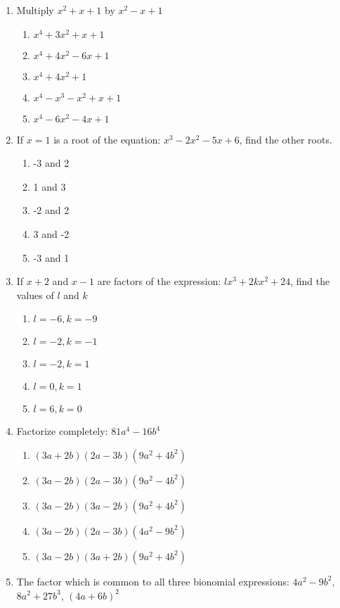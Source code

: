 \begin{multicols}{2}
\begin{enumerate}[label={\arabic*.}]
\begin{enumerate}[label={\Alph*.}]
      \end{enumerate}
    \item Multiply \({x}^{2}+x+1\) by \({x}^{2}-x+1\)
      \begin{enumerate}[label={\Alph*.}]
        \item \(x^4+3{x}^{2}+x+1\)
        \item \(x^4+4{x}^{2}-6x+1\)
        \item \(x^4+4{x}^{2}+1\)
        \item \(x^4-{x}^{3}-{x}^{2}+x+1\)
        \item \(x^4-6{x}^{2}-4x+1\)
      \end{enumerate}
    \item If \(x = 1\) is a root of the equation: \({x}^{3}-2{x}^{2}-5x+6\), find the other roots.
      \begin{enumerate}[label={\Alph*.}]
        \item -3 and 2
        \item 1 and 3
        \item -2 and 2
        \item 3 and -2
        \item -3 and 1
      \end{enumerate}
    \item If \(x+2\) and \(x-1\) are factors of the expression: \(l{x}^{3}+2k{x}^{2}+24\), find the values of \(l\) and \(k\)
      \begin{enumerate}[label={\Alph*.}]
        \item \(l=-6, k=-9\)
        \item \(l=-2, k=-1\)
        \item \(l=-2, k=1\)
        \item \(l=0, k=1\)
        \item \(l=6, k=0\)
      \end{enumerate}
    \item Factorize completely: \(81a^4-16b^4\)
      \begin{enumerate}[label={\Alph*.}]
        \item \((3a+2b)(2a-3b)(9a^2+4b^2)\)
        \item \((3a-2b)(2a-3b)(9a^2-4b^2)\)
        \item \((3a-2b)(3a-2b)(9a^2+4b^2)\)
        \item \((3a-2b)(2a-3b)(4a^2-9b^2)\)
        \item \((3a-2b)(3a+2b)(9a^2+4b^2)\)
      \end{enumerate}
    \item The factor which is common to all three bionomial expressions: \(4a^2-9b^2\), \(8a^2+27b^3\), \({(4a+6b)}^2\)

\end{enumerate}
\end{multicols}
